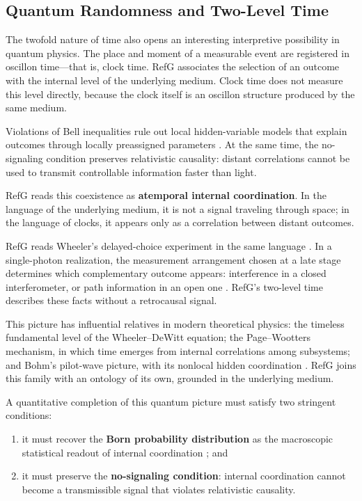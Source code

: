 \documentclass[11pt,a4paper]{article}
\begin{document}
\subsection{Quantum Randomness and Two-Level Time}

The twofold nature of time also opens an interesting interpretive possibility in quantum physics. The place and moment of a measurable event are registered in oscillon time---that is, clock time. RefG associates the selection of an outcome with the internal level of the underlying medium. Clock time does not measure this level directly, because the clock itself is an oscillon structure produced by the same medium.

Violations of Bell inequalities rule out local hidden-variable models that explain outcomes through locally preassigned parameters \citep{bell1964,hensen2015}. At the same time, the no-signaling condition preserves relativistic causality: distant correlations cannot be used to transmit controllable information faster than light.

RefG reads this coexistence as \textbf{atemporal internal coordination}. In the language of the underlying medium, it is not a signal traveling through space; in the language of clocks, it appears only as a correlation between distant outcomes.

RefG reads Wheeler's delayed-choice experiment in the same language \citep{wheeler1978}. In a single-photon realization, the measurement arrangement chosen at a late stage determines which complementary outcome appears: interference in a closed interferometer, or path information in an open one \citep{jacques2007}. RefG's two-level time describes these facts without a retrocausal signal.

This picture has influential relatives in modern theoretical physics: the timeless fundamental level of the Wheeler--DeWitt equation; the Page--Wootters mechanism, in which time emerges from internal correlations among subsystems; and Bohm's pilot-wave picture, with its nonlocal hidden coordination \citep{dewitt1967,pagewootters1983,bohm1952}. RefG joins this family with an ontology of its own, grounded in the underlying medium.

A quantitative completion of this quantum picture must satisfy two stringent conditions:

\begin{enumerate}
\item it must recover the \textbf{Born probability distribution} as the macroscopic statistical readout of internal coordination \citep{born1926}; and
\item it must preserve the \textbf{no-signaling condition}: internal coordination cannot become a transmissible signal that violates relativistic causality.
\end{enumerate}
\end{document}
